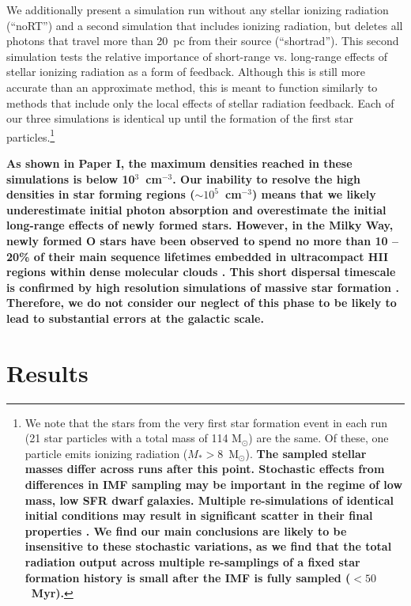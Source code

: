 \documentclass[twocolumn]{aastex62}
\begin{document}
We additionally present a simulation run without any stellar ionizing radiation (``noRT'') and a second simulation that includes ionizing radiation, but deletes all photons that travel more than 20~pc from their source (``shortrad''). This second simulation tests the relative importance of short-range vs. long-range effects of stellar ionizing radiation as a form of feedback. Although this is still more accurate than an approximate method, this is meant to function similarly to methods that include only the local effects of stellar radiation feedback. Each of our three simulations is identical up until the formation of the first star particles.\footnote{We note that the stars from the very first star formation event in each run (21 star particles with a total mass of 114 M$_{\odot}$) are the same. Of these, one particle emits ionizing radiation ($M_* > 8 $~M$_{\odot}$). \textbf{The sampled stellar masses differ across runs after this point. Stochastic effects from differences in IMF sampling may be important in the regime of low mass, low SFR dwarf galaxies. Multiple re-simulations of identical initial conditions may result in significant scatter in their final properties \citep{Keller2018}. We find our main conclusions are likely to be insensitive to these stochastic variations, as we find that the total radiation output across multiple re-samplings of a fixed star formation history is small after the IMF is fully sampled ($<50$~Myr).}}

\textbf{As shown in Paper I, the maximum densities reached in these simulations is below 10$^{3}$~cm$^{-3}$. Our inability to resolve the high densities in star forming regions ($\sim 10^5$~cm$^{-3}$) means that we likely underestimate initial photon absorption and overestimate the initial long-range effects of newly formed stars. However, in the Milky Way, newly formed O stars have been observed to spend no more than  10 -- 20\% of their main sequence lifetimes embedded in ultracompact HII regions within dense molecular clouds \citep{WoodChurchwell1989}. This short dispersal timescale is confirmed by high resolution simulations of massive star formation \citep[e.g.][]{Peters2010,Dale2014,Kim2018}. Therefore, we do not consider our neglect of this phase to be likely to lead to substantial errors at the galactic scale.}

\section{Results} \label{sec:results}
\end{document}
